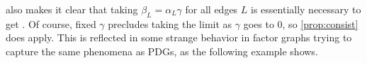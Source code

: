 \documentclass[letterpaper]{article} %
\theoremstyle{plain}
\theoremstyle{definition}
\theoremstyle{remark}
\newcommand{\commentout}[1]{\ignorespaces}
\newcommand{\valpha}[1]{#1}
\newcommand\mat[1]{\mathbf{#1}}
\begin{document}
\commentout{
We now explain how the middle term may be viewed as a ``local'' regularization,
and why including such a term is necessary for the semantics to 
view our cpds $\mat p$ as assertions about probability%
. 
}

 also makes it clear that 
taking $\beta_L = \valpha{\alpha_L} \gamma$ for all edges $L$ is
essentially necessary to get .
Of course, fixed $\gamma$ precludes taking the limit as $\gamma$ goes
to 0, so 
\cref{prop:consist} does apply. This is reflected in 
%
some strange
behavior in factor graphs trying to capture the same phenomena as
PDGs, as the following example shows.
\end{document}
